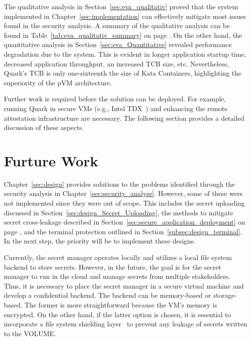 The qualitative analysis in Section~\ref{sec:eva_qualitativ} proved that the system implemented in Chapter~\ref{sec:implementation} can effectively mitigate most issues found in the security analysis. A summary of the qualitative analysis can be found in Table~\ref{tab:eva_qualitativ_summary} on page \pageref{tab:eva_qualitativ_summary}. 
On the other hand, the quantitative analysis in Section~\ref{sec:eva_Quantitative} revealed performance degradation due to the system. This is evident in longer application startup time, 
decreased application throughput, an increased \acrshort{TCB} size, etc. Nevertheless, Quark's \acrshort{TCB} is only one-sixteenth the size of Kata Containers\cite*{Kata-Containers}, highlighting the superiority of the \acrshort{pVM} architecture. 
 
Further work is required before the solution can be deployed. For example, running Quark in secure VMs (e.g., Intel TDX~\cite*{Intel_tdx_whitepaper}) and enhancing the remote attestation infrastructure are necessary. The following section provides a detailed discussion of these aspects.


\section{Furture Work}

Chapter~\ref{sec:design} provides solutions to the problems identified through the security analysis in Chapter~\ref{sec:security_analyse}. However, some of these were not implemented since they were out of scope. This includes the secret uploading discussed in 
Section~\ref{sec:design_Secret_Uploading}, the methods to mitigate secret cross-leakage described in Section~\ref{sec:secure_application_deployment} on page \pageref{eq:1}, and the terminal protection outlined in Section~\ref{subsec:design_terminal}. In the next step, the 
priority will be to implement these designs.

Currently, the secret manager operates locally and utilizes a local file system backend to store secrets. However, in the future, the goal is for the secret manager to run in the cloud and manage secrets from multiple stakeholders. Thus, it is necessary to place the secret manager in 
a secure virtual machine and develop a confidential backend. The backend can be memory-based or storage-based. The former is more straightforward because the VM's memory is encrypted. On the other hand, if the latter option is chosen, it is essential to 
incorporate a file system shielding layer~\cite*{file_system_shield} to prevent any leakage of secrets written to the VOLUME.

